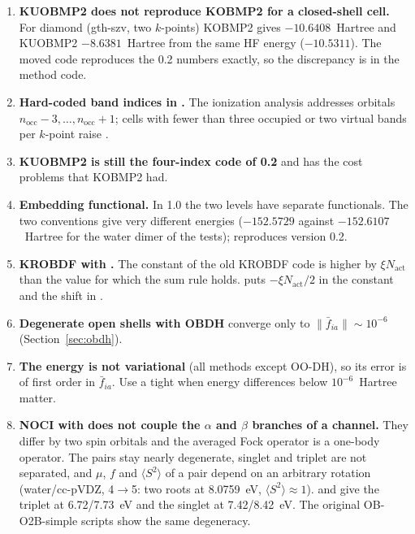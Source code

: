 \begin{enumerate}
  \item \textbf{KUOBMP2 does not reproduce KOBMP2 for a closed-shell cell.}
        For diamond (gth-szv, two $k$-points) KOBMP2 gives
        $-10.6408$~Hartree and KUOBMP2 $-8.6381$~Hartree from the same HF
        energy ($-10.5311$). The moved code reproduces the 0.2 numbers
        exactly, so the discrepancy is in the method code.
  \item \textbf{Hard-coded band indices in .} The
        ionization analysis addresses orbitals $n_{\mathrm{occ}}-3,\ldots,
        n_{\mathrm{occ}}+1$; cells with fewer than three occupied or two
        virtual bands per $k$-point raise .
  \item \textbf{KUOBMP2 is still the four-index code of 0.2} and has the cost
        problems that KOBMP2 had.
  \item \textbf{Embedding functional.} In 1.0 the two levels have separate
        functionals. The two conventions give very different energies
        ($-152.5729$ against $-152.6107$~Hartree for the water dimer of the
        tests);  reproduces version 0.2.
  \item \textbf{KROBDF with .} The constant of the old
        KROBDF code is higher by $\xi N_{\mathrm{act}}$ than the value for
        which the sum rule holds.  puts $-\xi N_{\mathrm{act}}/2$
        in the constant and the shift in .
  \item \textbf{Degenerate open shells with OBDH} converge only to
        $\|\bar f_{ia}\|\sim10^{-6}$ (Section~\ref{sec:obdh}).
  \item \textbf{The energy is not variational} (all methods except OO-DH),
        so its error is of first order in $\bar f_{ia}$. Use a tight
         when energy differences below $10^{-6}$~Hartree
        matter.
  \item \textbf{NOCI with  does not couple the
        $\alpha$ and $\beta$ branches of a channel.} They differ by two spin
        orbitals and the averaged Fock operator is a one-body operator. The
        pairs stay nearly degenerate, singlet and triplet are not separated,
        and $\mu$, $f$ and $\langle S^2\rangle$ of a pair depend on an
        arbitrary rotation (water/cc-pVDZ, 4$\to$5: two roots at 8.0759~eV,
        $\langle S^2\rangle\approx1$).  and
         give the triplet at 6.72/7.73~eV and the
        singlet at 7.42/8.42~eV. The original OB-O2B-simple scripts show the
        same degeneracy.
\end{enumerate}

